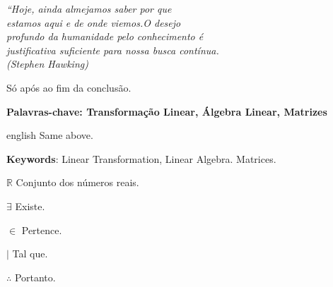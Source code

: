 \documentclass[
12pt,
 a4paper,
    english,
    brazil,
    oneside
    ]{abntex2}
\begin{document}
	\begin{epigrafe}
		\vspace*{\fill}
		\begin{flushright}
			\textit{``Hoje, ainda almejamos saber por que\\
				estamos aqui e de onde viemos.O desejo\\
				profundo da humanidade pelo	conhecimento é\\
				justificativa suficiente para nossa busca contínua.\\
				(Stephen Hawking)}
		\end{flushright}
	\end{epigrafe}
	
	
	\setlength{\absparsep}{18pt} %
	\begin{resumo}
		Só após ao fim da conclusão.
		
		\textbf{Palavras-chave: Transformação Linear, Álgebra Linear, Matrizes}
	\end{resumo}
		
	
	\begin{resumo}[Abstract]
		\begin{otherlanguage*}{english}
			Same above.
			
			\vspace{\onelineskip}
			
			\noindent 
			\textbf{Keywords}: Linear Transformation, Linear Algebra. Matrices.
		\end{otherlanguage*}
	\end{resumo}
	
	\listoftables*
	\cleardoublepage
	
	\begin{simbolos}
		\item[$ \mathbb{R} $] Conjunto dos números reais.
		\item[$\exists$] Existe.
		\item[$\in$] Pertence.
		\item[$\mid$] Tal que.
		\item[$\therefore$] Portanto.
	\end{simbolos}
	
	
	\tableofcontents*
	\cleardoublepage
	
	
	\textual
	
	
		
	
	
	
	
	
	
	
		
	
	

		
\end{document}
